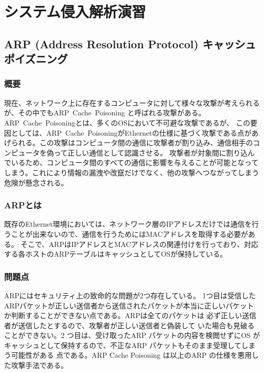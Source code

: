 ﻿\chapter{システム侵入解析演習}

\section{ARP (Address Resolution Protocol) キャッシュポイズニング}
\subsection{概要}
現在、ネットワーク上に存在するコンピュータに対して様々な攻撃が考えられるが、その中でもARP\ Cache\ Poisoning
と呼ばれる攻撃がある。ARP\ Cache\ Poisoningとは、多くのOSにおいて不可避な攻撃であるが、
この要因としては、ARP\ Cache\ PoisoningがEthernetの仕様に基づく攻撃である点があげられる。この攻撃はコンピュータ間の通信に攻撃者が割り込み、通信相手のコンピュータを偽って正しい通信として認識させる。
攻撃者が対象間に割り込んでいるため、コンピュータ間のすべての通信に影響を与えることが可能となってしまう。これにより情報の漏洩や改竄だけでなく、他の攻撃へつながってしまう危険が懸念される\cite{arp}。

\subsection{ARPとは}
既存のEthernet環境においては、ネットワーク層のIPアドレスだけでは通信を行うことが出来ないので、通信を行うためにはMACアドレスを取得する必要がある。
そこで、ARPはIPアドレスとMACアドレスの関連付けを行っており、対応する各ホストのARPテーブルはキャッシュとしてOSが保持している。\cite{ip-arp}
\subsection{問題点}
ARPにはセキュリティ上の致命的な問題が2つ存在している。
1つ目は受信したARPパケットが正しい送信者から送信されたパケットが本当に正しいパケットか判断することができない点である。ARPは全てのパケットは
必ず正しい送信者が送信したとするので、攻撃者が正しい送信者と偽装して
いた場合も見破ることができない。2 つ目は、受け取ったARP パケットの内容を検閲せずにOS
がキャッシュとして保持するので、不正なARP パケットもそのまま受理してしまう可能性がある
点である。ARP Cache Poisoning は以上のARP の仕様を悪用した攻撃手法である。

